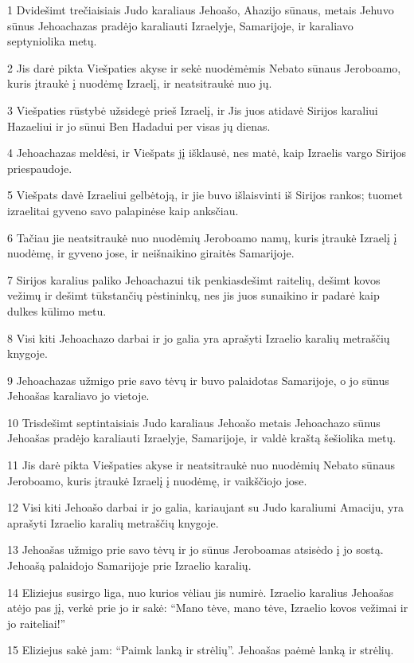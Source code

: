 \par 1 Dvidešimt trečiaisiais Judo karaliaus Jehoašo, Ahazijo sūnaus, metais Jehuvo sūnus Jehoachazas pradėjo karaliauti Izraelyje, Samarijoje, ir karaliavo septyniolika metų. 
\par 2 Jis darė pikta Viešpaties akyse ir sekė nuodėmėmis Nebato sūnaus Jeroboamo, kuris įtraukė į nuodėmę Izraelį, ir neatsitraukė nuo jų. 
\par 3 Viešpaties rūstybė užsidegė prieš Izraelį, ir Jis juos atidavė Sirijos karaliui Hazaeliui ir jo sūnui Ben Hadadui per visas jų dienas. 
\par 4 Jehoachazas meldėsi, ir Viešpats jį išklausė, nes matė, kaip Izraelis vargo Sirijos priespaudoje. 
\par 5 Viešpats davė Izraeliui gelbėtoją, ir jie buvo išlaisvinti iš Sirijos rankos; tuomet izraelitai gyveno savo palapinėse kaip anksčiau. 
\par 6 Tačiau jie neatsitraukė nuo nuodėmių Jeroboamo namų, kuris įtraukė Izraelį į nuodėmę, ir gyveno jose, ir neišnaikino giraitės Samarijoje. 
\par 7 Sirijos karalius paliko Jehoachazui tik penkiasdešimt raitelių, dešimt kovos vežimų ir dešimt tūkstančių pėstininkų, nes jis juos sunaikino ir padarė kaip dulkes kūlimo metu. 
\par 8 Visi kiti Jehoachazo darbai ir jo galia yra aprašyti Izraelio karalių metraščių knygoje. 
\par 9 Jehoachazas užmigo prie savo tėvų ir buvo palaidotas Samarijoje, o jo sūnus Jehoašas karaliavo jo vietoje. 
\par 10 Trisdešimt septintaisiais Judo karaliaus Jehoašo metais Jehoachazo sūnus Jehoašas pradėjo karaliauti Izraelyje, Samarijoje, ir valdė kraštą šešiolika metų. 
\par 11 Jis darė pikta Viešpaties akyse ir neatsitraukė nuo nuodėmių Nebato sūnaus Jeroboamo, kuris įtraukė Izraelį į nuodėmę, ir vaikščiojo jose. 
\par 12 Visi kiti Jehoašo darbai ir jo galia, kariaujant su Judo karaliumi Amaciju, yra aprašyti Izraelio karalių metraščių knygoje. 
\par 13 Jehoašas užmigo prie savo tėvų ir jo sūnus Jeroboamas atsisėdo į jo sostą. Jehoašą palaidojo Samarijoje prie Izraelio karalių. 
\par 14 Eliziejus susirgo liga, nuo kurios vėliau jis numirė. Izraelio karalius Jehoašas atėjo pas jį, verkė prie jo ir sakė: “Mano tėve, mano tėve, Izraelio kovos vežimai ir jo raiteliai!” 
\par 15 Eliziejus sakė jam: “Paimk lanką ir strėlių”. Jehoašas paėmė lanką ir strėlių. 
